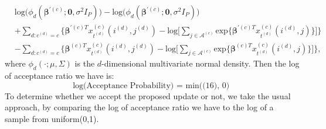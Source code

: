 \documentclass[a4paper]{article}
\begin{document}
 \begin{equation}
 \begin{aligned} 
 &\mbox{log}\Big(\phi_d(\boldsymbol{\beta}^{\prime(c)};\mathbf{0}, \sigma^2I_P)\Big)-\mbox{log}\Big(\phi_d(\boldsymbol{\beta}^{\prime(c)};\mathbf{0}, \sigma^2I_P)\Big)\\&+\sum_{d:c^{(d)}=c}\Big\{\boldsymbol{\beta}^{\prime(c)T}x^{(c)}_{t^{(d)}}(i^{(d)}, j^{(d)})-\mbox{log}\big[\sum_{j\in \mathcal{A}^{(c)}}\mbox{exp}\{\boldsymbol{\beta}^{\prime(c)T}x^{(c)}_{t^{(d)}}(i^{(d)}, j)\}\big]\Big\}\\&-\sum_{d:c^{(d)}=c} \Big\{\boldsymbol{\beta}^{(c)T}x^{(c)}_{t^{(d)}}(i^{(d)}, j^{(d)})-\mbox{log}\big[\sum_{j\in \mathcal{A}^{(c)}}\mbox{exp}\{\boldsymbol{\beta}^{(c)T}x^{(c)}_{t^{(d)}}(i^{(d)}, j)\}\big]\Big\},
 \end{aligned}
 \end{equation}
 where $\phi_d(\cdot;\mu, \Sigma)$ is the $d$-dimensional multivariate normal density.
 Then the log of acceptance ratio we have is:
 \begin{equation}
 \mbox{log(Acceptance Probability) = min((16), 0) }
 \end{equation}
 To determine whether we accept the proposed update or not, we take the usual approach, by comparing the log of acceptance ratio we have to the log of a sample from uniform(0,1).\\
\end{document}
